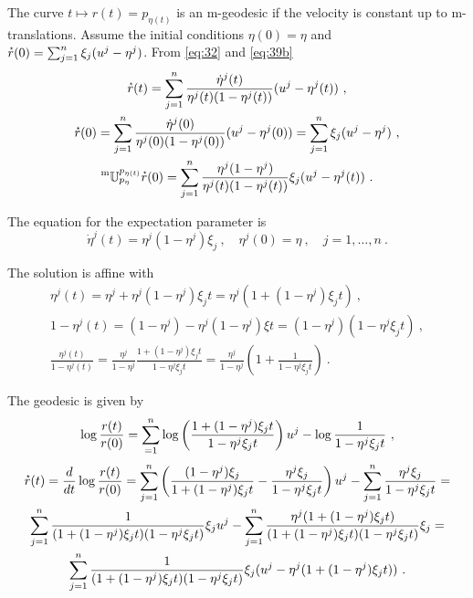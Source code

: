 \documentclass[12pt,a4paper]{amsart}
\theoremstyle{remark}
\begin{document}
The curve $t \mapsto r(t) = p_{\eta(t)}$ is an m-geodesic if the velocity is constant up to m-translations. Assume the initial conditions $\eta(0) = \eta$ and $\accentset{\star}{r}(0) = \sum_{j=1}^n \xi_j(u^j - \eta^j)$. From \cref{eq:32} and \cref{eq:39b}
\begin{gather}
  \label{eq:40}
  \accentset{\star}{r}(t) =  \sum_{j=1}^n \frac{\dot \eta^j(t)}{\eta^j(t)(1 - \eta^j(t))} (u^j - \eta^j(t)) \ , \\
  \accentset{\star}{r}(0) =  \sum_{j=1}^n \frac{\dot \eta^j(0)}{\eta^j(0)(1 - \eta^j(0))} (u^j - \eta^j(0)) = \sum_{j=1}^n \xi_j(u^j - \eta^j) \ , \\
\prescript{\text{m}}{} {\mathbb U} _ {p_{\eta}} ^ {p_{\eta(t)}} \accentset{\star}{r}(0) =  \sum_{j=1}^n \frac{\eta^j(1-\eta^j)} {\eta^j(t)(1-\eta^j(t))} \xi_j (u^j - \eta^j(t)) \ .
\end{gather}

The equation for the expectation parameter is
\begin{equation}
  \label{eq:41}
  \dot \eta^j(t) = \eta^j(1-\eta^j) \xi_j \ , \quad \eta^j(0) = \eta \ , \quad j = 1,\dots,n \ .
\end{equation}

The solution is affine with
\begin{gather}
  \label{eq:44}
  \eta^j(t) = \eta^j + \eta^j(1-\eta^j) \xi_j t = \eta^j\left (1 + (1-\eta^j) \xi_j t\right) \ ,\\
  1 - \eta^j(t) = (1 - \eta^j) - \eta^j(1-\eta^j) \xi t = (1 - \eta^j)(1 -\eta^j\xi_j t) \ , \\
  \frac{\eta^j(t)}{1-\eta^j(t)} = \frac{\eta^j}{1-\eta^j} \frac{1 + (1-\eta^j) \xi_j t}{1 -\eta^j\xi_j t} = \frac{\eta^j}{1-\eta^j} \left(1 + \frac{1}{1 -\eta^j\xi_j t}\right) \ .
\end{gather}

The geodesic is given by 
\begin{equation}
  \label{eq:42}
  \log \frac{r(t)}{r(0)} = \sum_{=1}^n \log\left(\frac{1 + (1-\eta^j) \xi_j t}{1 -\eta^j\xi_j t}\right) u^j - \log \frac1{1 -\eta^j\xi_j t} \ ,
\end{equation}
\begin{multline}
  \accentset{\star}{r}(t) = \frac{d}{dt} \log \frac{r(t)}{r(0)} = \sum_{j=1}^n \left(\frac{(1 -\eta^j)\xi_j}{1 + (1-\eta^j) \xi_j t} - \frac{\eta^j\xi_j}{1 - \eta^j \xi_j t} \right) u^j - \sum_{j=1}^n \frac{\eta^j\xi_j}{1-\eta^j\xi_jt} = \\
  \sum_{j=1}^n \frac{1}{(1 + (1-\eta^j) \xi_j t)(1 - \eta^j \xi_j t)} \xi_j u^j 
- \sum_{j=1}^n \frac{\eta^j(1 + (1-\eta^j) \xi_j t)}{(1 + (1-\eta^j) \xi_j t)(1 - \eta^j \xi_j t)} \xi_j  = \\
 \sum_{j=1}^n \frac{1}{(1 + (1-\eta^j) \xi_j t)(1 - \eta^j \xi_j t)} \xi_j (u^j - \eta^j(1 + (1-\eta^j) \xi_j t)) \ . \end{multline}
\end{document}
